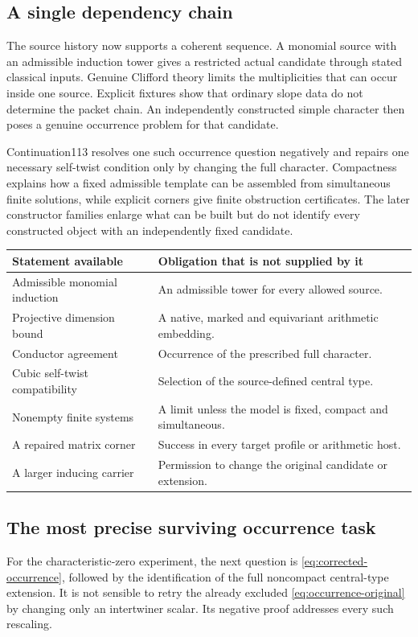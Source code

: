 \documentclass[11pt]{article}
\theoremstyle{definition}\newtheorem{definition}[proposition]{Definition}
\begin{document}
\subsection{A single dependency chain}
The source history now supports a coherent sequence. A monomial source with an admissible induction tower gives a restricted actual candidate through stated classical inputs. Genuine Clifford theory limits the multiplicities that can occur inside one source. Explicit fixtures show that ordinary slope data do not determine the packet chain. An independently constructed simple character then poses a genuine occurrence problem for that candidate.

Continuation113 resolves one such occurrence question negatively and repairs one necessary self-twist condition only by changing the full character. Compactness explains how a fixed admissible template can be assembled from simultaneous finite solutions, while explicit corners give finite obstruction certificates. The later constructor families enlarge what can be built but do not identify every constructed object with an independently fixed candidate.

\begin{center}
\begin{tabular}{@{}>{\raggedright\arraybackslash}p{.30\linewidth}>{\raggedright\arraybackslash}p{.62\linewidth}@{}}
\toprule
Statement available & Obligation that is not supplied by it \\
\midrule
Admissible monomial induction & An admissible tower for every allowed source. \\
Projective dimension bound & A native, marked and equivariant arithmetic embedding. \\
Conductor agreement & Occurrence of the prescribed full character. \\
Cubic self-twist compatibility & Selection of the source-defined central type. \\
Nonempty finite systems & A limit unless the model is fixed, compact and simultaneous. \\
A repaired matrix corner & Success in every target profile or arithmetic host. \\
A larger inducing carrier & Permission to change the original candidate or extension. \\
\bottomrule
\end{tabular}
\end{center}

\subsection{The most precise surviving occurrence task}
For the characteristic-zero experiment, the next question is \eqref{eq:corrected-occurrence}, followed by the identification of the full noncompact central-type extension. It is not sensible to retry the already excluded \eqref{eq:occurrence-original} by changing only an intertwiner scalar. Its negative proof addresses every such rescaling.
\end{document}

